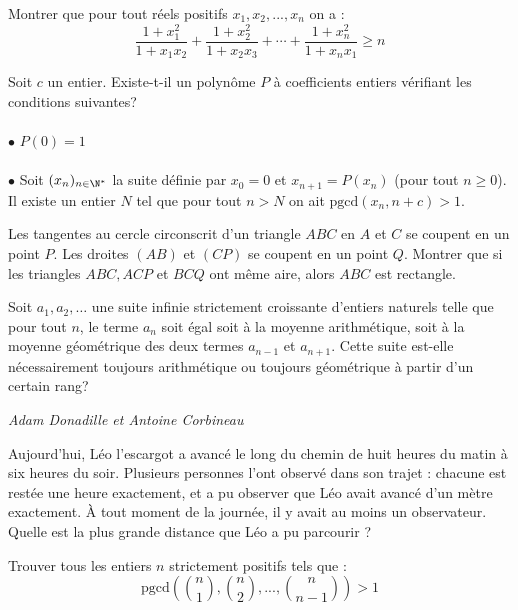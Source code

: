 \begin{exo}{}
Montrer que pour tout réels positifs $x_1,x_2,...,x_n$ on a :
$$\frac{1+x_{1}^2}{1+x_{1}x_{2}}+\frac{1+x_{2}^2}{1+x_{2}x_{3}}+\cdots+\frac{1+x_{n}^2}{1+x_{n}x_{1}}\geq n$$
\end{exo}

\begin{exo}{}
Soit $c$ un entier. Existe-t-il un polynôme $P$ à coefficients entiers vérifiant les conditions suivantes?\\~~\\
$\bullet$ $P(0)=1$\\~~\\
$\bullet$ Soit $(x_n)_{n\in \N^*}$  la suite définie par $x_0=0$ et $x_{n+1}=P(x_n)$ (pour tout $n\ge 0$). Il existe un entier $N$ tel que pour tout $n>N$ on ait $\text{pgcd}(x_n,n+c)>1$.
\end{exo}

\begin{exo}{}
Les tangentes au cercle circonscrit d'un triangle $ABC$ en $A$ et $C$ se coupent en un point $P$. Les droites $(AB)$ et $(CP)$ se coupent en un point $Q$. Montrer que si les triangles $ABC,ACP$ et $BCQ$ ont même aire, alors $ABC$ est rectangle.
\end{exo}

\begin{exo}{}Soit $a_1,a_2,\ldots$ une suite infinie strictement croissante d'entiers naturels telle que pour tout $n$, le terme $a_n$ soit égal soit à la moyenne arithmétique, soit à la moyenne géométrique des deux termes $a_{n-1}$ et $a_{n+1}$. Cette suite est-elle nécessairement toujours arithmétique ou toujours géométrique à partir d'un certain rang?

\medskip
\textit{Adam Donadille et Antoine Corbineau}
\end{exo}

\begin{exo}{}
Aujourd'hui, Léo l'escargot a avancé le long du chemin de huit heures du matin à six heures du soir. Plusieurs personnes l'ont observé dans son trajet : chacune est restée une heure exactement, et a pu observer que Léo avait avancé d'un mètre exactement. \`{A} tout moment de la journée, il y avait au moins un observateur. Quelle est la plus grande distance que Léo a pu parcourir ?
\end{exo}


\begin{exo}{}
Trouver tous les entiers $n$ strictement positifs tels que :
$$\text{pgcd}\left(\binom{n}{1},\binom{n}{2},...,\binom{n}{n-1}\right)>1$$

\end{exo}

